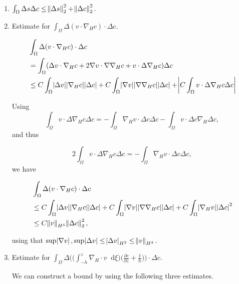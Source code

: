 \documentclass[11pt]{article}
\newcommand*\diff{\mathop{}\!\mathrm{d}}
\begin{document}
\begin{enumerate}

  \item $\int_\Omega \Delta s \Delta c \leq \norm{\Delta s}_2^2 + \norm{\Delta c}_2^2.$
  
  \item Estimate for $\int_\Omega \Delta ( v \cdot \nabla_H c) \cdot \Delta c.$
  
\begin{equation}
  \begin{split}
    & \int_\Omega \Delta ( v \cdot \nabla_H c) \cdot \Delta c \\
    & = \int_\Omega (\Delta v \cdot \nabla_H c + 2 \nabla v \cdot \nabla \nabla_H c + v \cdot \Delta \nabla_H c) \Delta c \\
    & \leq C \int_\Omega \abs{\Delta v} \abs{\nabla_H c} \abs{\Delta c} + C \int_\Omega \abs{\nabla v} \abs{\nabla \nabla_H c} \abs{\Delta c} + \abs{C \int_\Omega v \cdot \Delta \nabla_H c \Delta c}
  \end{split}
\end{equation}

Using $$\int_\Omega v \cdot \Delta \nabla_H c \Delta c = - \int_\Omega \nabla_H v \cdot \Delta c \Delta c - \int_\Omega v \cdot \Delta c \nabla_H \Delta c,$$ and thus

$$2 \int_\Omega v \cdot \Delta \nabla_H c \Delta c = - \int_\Omega \nabla_H v \cdot \Delta c \Delta c,$$ we have

\begin{equation}
  \begin{split}
    & \int_\Omega \Delta ( v \cdot \nabla_H c) \cdot \Delta c \\
    & \leq C \int_\Omega \abs{\Delta v} \abs{\nabla_H c} \abs{\Delta c} + C \int_\Omega \abs{\nabla v} \abs{\nabla \nabla_H c} \abs{\Delta c} + C \int_\Omega \abs{\nabla_H v} \abs{\Delta c}^2 \\
    & \leq C \norm{v}_{H^4} \norm{\Delta c}_2^2,
  \end{split}
\end{equation}

using that $\sup \abs{\nabla v}, \sup \abs{\Delta v} \leq \abs{\Delta v}_{H^2} \leq \norm{v}_{H^4}.$
  
  \item Estimate for $\int_\Omega \Delta \bigg ( \bigg ( \int_{-h}^z \nabla_H \cdot v \diff \xi \bigg) \bigg ( \frac{\partial c}{\partial z}+ \frac{1}{h}\bigg) \bigg ) \cdot \Delta c.$

We can construct a bound by using the following three estimates.


\end{enumerate}
\end{document}
